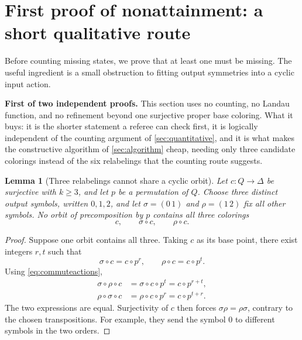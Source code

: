 \documentclass[11pt,a4paper]{article}
\numberwithin{equation}{section}
\newtheorem{lemma}[theorem]{Lemma}
\theoremstyle{definition}
\theoremstyle{remark}
\newcommand{\D}{\Delta}
\begin{document}
\section{First proof of nonattainment: a short qualitative
route}\label{sec:qualitative}

Before counting missing states, we prove that at least one must be missing.
The useful ingredient is a small obstruction to fitting output symmetries
into a cyclic input action.

\begin{resultbox}
\textbf{First of two independent proofs.} This section uses no counting, no
Landau function, and no refinement beyond one surjective proper base
coloring. What it buys: it is the shorter statement a referee can check
first, it is logically independent of the counting argument of
\cref{sec:quantitative}, and it is what makes the constructive algorithm of
\cref{sec:algorithm} cheap, needing only three candidate colorings instead of
the six relabelings that the counting route suggests.
\end{resultbox}

\begin{lemma}[Three relabelings cannot share a cyclic orbit]\label{lem:three}
Let $c:Q\to\D$ be surjective with $k\ge3$, and let $p$ be a permutation of
$Q$. Choose three distinct output symbols, written $0,1,2$, and let
$\sigma=(0\,1)$ and $\rho=(1\,2)$ fix all other symbols. No orbit of
precomposition by $p$ contains all three colorings
\[
 c,\qquad \sigma\circ c,\qquad \rho\circ c.
\]
\end{lemma}
\begin{proof}
Suppose one orbit contains all three. Taking $c$ as its base point, there
exist integers $r,t$ such that
\[
 \sigma\circ c=c\circ p^r,\qquad
 \rho\circ c=c\circ p^t.
\]
Using \eqref{eq:commuteactions},
\begin{align*}
 \sigma\circ\rho\circ c
 &=\sigma\circ c\circ p^t
 =c\circ p^{r+t},\\
 \rho\circ\sigma\circ c
 &=\rho\circ c\circ p^r
 =c\circ p^{t+r}.
\end{align*}
The two expressions are equal. Surjectivity of $c$ then forces
$\sigma\rho=\rho\sigma$, contrary to the chosen transpositions. For example,
they send the symbol $0$ to different symbols in the two orders.
\end{proof}
\end{document}
